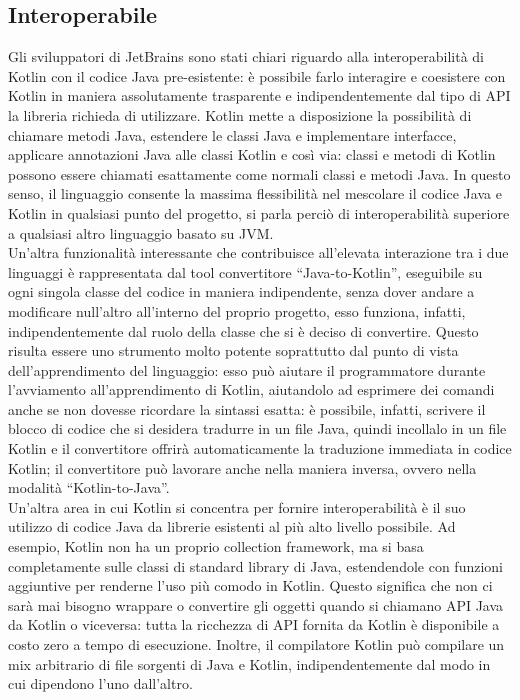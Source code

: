\subsection{Interoperabile}

Gli sviluppatori di JetBrains sono stati chiari riguardo alla interoperabilità di Kotlin con il codice Java pre-esistente: è possibile farlo interagire e coesistere con Kotlin in maniera assolutamente trasparente e indipendentemente dal tipo di API la libreria richieda di utilizzare. Kotlin mette a disposizione la possibilità di chiamare metodi Java, estendere le classi Java e implementare interfacce, applicare annotazioni Java alle classi Kotlin e così via: classi e metodi di Kotlin possono essere chiamati esattamente come normali classi e metodi Java. In questo senso, il linguaggio consente la massima flessibilità nel mescolare il codice Java e Kotlin in qualsiasi punto del progetto, si parla perciò di interoperabilità superiore a qualsiasi altro linguaggio basato su JVM.\\
Un’altra funzionalità interessante che contribuisce all’elevata interazione tra i due linguaggi è rappresentata dal tool convertitore “Java-to-Kotlin”, eseguibile su ogni singola classe del codice in maniera indipendente, senza dover andare a modificare null’altro all’interno del proprio progetto, esso funziona, infatti, indipendentemente dal ruolo della classe che si è deciso di convertire. Questo risulta essere uno strumento molto potente soprattutto dal punto di vista dell’apprendimento del linguaggio: esso può aiutare il programmatore durante l’avviamento all'apprendimento di Kotlin, aiutandolo ad esprimere dei comandi anche se non dovesse ricordare la sintassi esatta: è possibile, infatti, scrivere il blocco di codice che si desidera tradurre in un file Java, quindi incollalo in un file Kotlin e il convertitore offrirà automaticamente la traduzione immediata in codice Kotlin; il convertitore può lavorare anche nella maniera inversa, ovvero nella modalità “Kotlin-to-Java”.\\
Un'altra area in cui Kotlin si concentra per fornire interoperabilità è il suo utilizzo di codice Java da librerie esistenti al più alto livello possibile. Ad esempio, Kotlin non ha un proprio collection framework, ma si basa completamente sulle classi di standard library di Java, estendendole con funzioni aggiuntive per renderne l’uso più comodo in Kotlin. Questo significa che non ci sarà mai bisogno wrappare o convertire gli oggetti quando si chiamano API Java da Kotlin o viceversa: tutta la ricchezza di API fornita da Kotlin è disponibile a costo zero a tempo di esecuzione. Inoltre, il compilatore Kotlin può compilare un mix arbitrario di file sorgenti di Java e Kotlin, indipendentemente dal modo in cui dipendono l'uno dall'altro.\\

